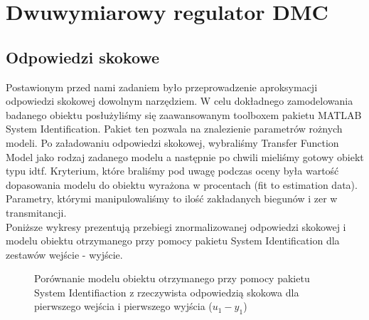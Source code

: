 \chapter{Dwuwymiarowy regulator DMC}
\label{thermal_dmc}


\section{Odpowiedzi skokowe}
\label{thermal_dmc_odp_skok}
Postawionym przed nami zadaniem było przeprowadzenie
aproksymacji odpowiedzi skokowej dowolnym narzędziem. W celu dokładnego zamodelowania badanego obiektu posłużyliśmy się zaawansowanym
toolboxem pakietu MATLAB System Identification. Pakiet ten
pozwala na znalezienie parametrów rożnych modeli. Po załadowaniu odpowiedzi
skokowej, wybraliśmy Transfer Function Model jako rodzaj zadanego modelu a
następnie po chwili mieliśmy gotowy obiekt typu idtf. Kryterium, które braliśmy
pod uwagę podczas oceny była wartość dopasowania modelu do obiektu
wyrażona w procentach (fit to estimation data).
Parametry, którymi manipulowaliśmy to ilość zakładanych biegunów i zer
w transmitancji.
\\ \indent Poniższe wykresy prezentują przebiegi znormalizowanej odpowiedzi skokowej i modelu obiektu otrzymanego przy pomocy pakietu System Identification dla
zestawów wejście - wyjście. 
\begin{figure}
        \centering
        \caption{Porównanie modelu obiektu otrzymanego przy pomocy pakietu System Identifiaction
z rzeczywista odpowiedzią skokowa dla pierwszego wejścia i pierwszego wyjścia ($u_{\mathrm{1}} - y_{\mathrm{1}}$)}
        \label{lab_dmc_1_out_pkt_pracy}
\end{figure}

